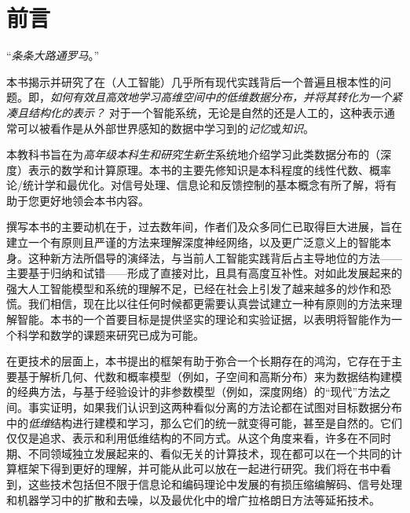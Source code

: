 \documentclass[../../book-main.tex]{subfiles}
\begin{document}
\chapter*{前言}

\begin{center}
“{\em 条条大路通罗马}。”

\end{center}
\vspace{5mm}

本书揭示并研究了在（人工智能）几乎所有现代实践背后一个普遍且根本性的问题。即，{\em 如何有效且高效地学习高维空间中的低维数据分布，并将其转化为一个紧凑且结构化的表示？} 对于一个智能系统，无论是自然的还是人工的，这种表示通常可以被看作是从外部世界感知的数据中学习到的{\em 记忆}或{\em 知识}。

本教科书旨在为{\em 高年级本科生和研究生新生}系统地介绍学习此类数据分布的（深度）表示的数学和计算原理。本书的主要先修知识是本科程度的线性代数、概率论/统计学和最优化。对信号处理、信息论和反馈控制的基本概念有所了解，将有助于您更好地领会本书内容。

撰写本书的主要动机在于，过去数年间，作者们及众多同仁已取得巨大进展，旨在建立一个有原则且严谨的方法来理解深度神经网络，以及更广泛意义上的智能本身。这种新方法所倡导的演绎法，与当前人工智能实践背后占主导地位的方法——主要基于归纳和试错——形成了直接对比，且具有高度互补性。对如此发展起来的强大人工智能模型和系统的理解不足，已经在社会上引发了越来越多的炒作和恐慌。我们相信，现在比以往任何时候都更需要认真尝试建立一种有原则的方法来理解智能。本书的一个首要目标是提供坚实的理论和实验证据，以表明将智能作为一个科学和数学的课题来研究已成为可能。

在更技术的层面上，本书提出的框架有助于弥合一个长期存在的鸿沟，它存在于主要基于解析几何、代数和概率模型（例如，子空间和高斯分布）来为数据结构建模的经典方法，与基于经验设计的非参数模型（例如，深度网络）的“现代”方法之间。事实证明，如果我们认识到这两种看似分离的方法论都在试图对目标数据分布中的{\em 低维}结构进行建模和学习，那么它们的统一就变得可能，甚至是自然的。它们仅仅是追求、表示和利用低维结构的不同方式。从这个角度来看，许多在不同时期、不同领域独立发展起来的、看似无关的计算技术，现在都可以在一个共同的计算框架下得到更好的理解，并可能从此可以放在一起进行研究。我们将在书中看到，这些技术包括但不限于信息论和编码理论中发展的有损压缩编解码、信号处理和机器学习中的扩散和去噪，以及最优化中的增广拉格朗日方法等延拓技术。
\end{document}
